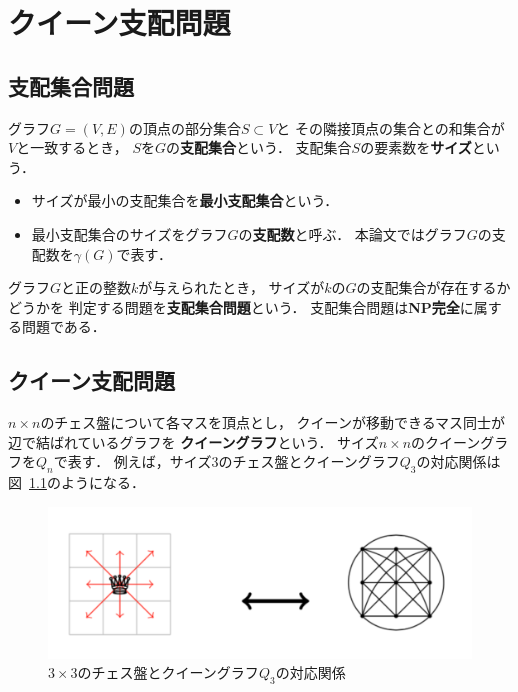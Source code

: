 \chapter{クイーン支配問題}\label{chap:background}

\section{支配集合問題}
グラフ$G=(V,E)$の頂点の部分集合$S\subset V$と
その隣接頂点の集合との和集合が$V$と一致するとき，
$S$を$G$の\textbf{支配集合}という．
支配集合$S$の要素数を\textbf{サイズ}という．
 \begin{itemize}
  \item サイズが最小の支配集合を\textbf{最小支配集合}という．
  \item 最小支配集合のサイズをグラフ$G$の\textbf{支配数}と呼ぶ．
    本論文ではグラフ$G$の支配数を$\gamma(G)$で表す．
 \end{itemize}

グラフ$G$と正の整数$k$が与えられたとき，
サイズが$k$の$G$の支配集合が存在するかどうかを
判定する問題を\textbf{支配集合問題}という．
支配集合問題は\textbf{NP完全}に属する問題である．

\section{クイーン支配問題}
$n\times n$のチェス盤について各マスを頂点とし，
クイーンが移動できるマス同士が辺で結ばれているグラフを
\textbf{クイーングラフ}という．
サイズ$n\times n$のクイーングラフを$Q_n$で表す．
例えば，サイズ3のチェス盤とクイーングラフ$Q_3$の対応関係は
図~\ref{ex:queengraph_3}のようになる．
 \begin{figure}[tb]
   \centering
   \includegraphics[width=1.0\linewidth]{fig/fig-queen_3_graph.pdf}
   \caption{$3 \times 3$のチェス盤とクイーングラフ$Q_3$の対応関係}
   \label{ex:queengraph_3}
 \end{figure}

